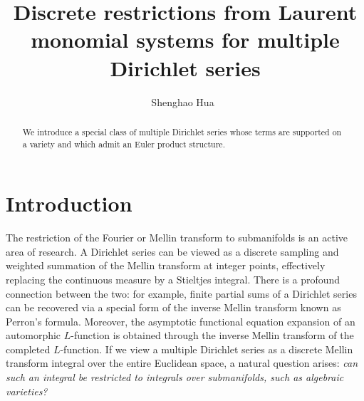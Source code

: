 \documentclass[12pt,reqno]{amsart}
\numberwithin{equation}{section}
\theoremstyle{plain}
\theoremstyle{definition}
\theoremstyle{remark}
\begin{document}
\title{Discrete restrictions from Laurent monomial systems for multiple Dirichlet series}

\author{Shenghao Hua~}



\begin{abstract}
We introduce a special class of multiple Dirichlet series whose terms are supported on a variety and which admit an Euler product structure.
\end{abstract}

\maketitle
\section{Introduction}

The restriction of the Fourier or Mellin transform to submanifolds is an active area of research.
A Dirichlet series can be viewed as a discrete sampling and weighted summation of the Mellin transform at integer points, effectively replacing the continuous measure by a Stieltjes integral. There is a profound connection between the two: for example, finite partial sums of a Dirichlet series can be recovered via a special form of the inverse Mellin transform known as Perron's formula. Moreover, the asymptotic functional equation expansion of an automorphic \( L \)-function is obtained through the inverse Mellin transform of the completed \( L \)-function.
If we view a multiple Dirichlet series as a discrete Mellin transform integral over the entire Euclidean space, a natural question arises: \emph{can such an integral be restricted to integrals over submanifolds, such as algebraic varieties?}
\end{document}
